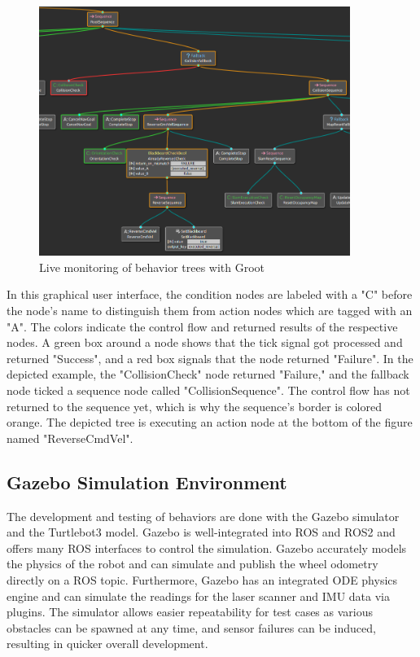 \begin{figure}[ht]
	\centering 
	\includegraphics[width=0.9\textwidth]{images/groot.png}
	\caption{Live monitoring of behavior trees with Groot}
	\label{fig:groot}
\end{figure}

In this graphical user interface, the condition nodes are labeled with a "C" before the node's name to distinguish them from action nodes which are tagged with an "A". The colors indicate the control flow and returned results of the respective nodes. A green box around a node shows that the tick signal got processed and returned "Success", and a red box signals that the node returned "Failure". In the depicted example, the "CollisionCheck" node returned "Failure," and the fallback node ticked a sequence node called "CollisionSequence". The control flow has not returned to the sequence yet, which is why the sequence's border is colored orange. The depicted tree is executing an action node at the bottom of the figure named "ReverseCmdVel".  

\subsection{Gazebo Simulation Environment}

The development and testing of behaviors are done with the Gazebo simulator and the Turtlebot3 model. Gazebo is well-integrated into ROS and ROS2 and offers many ROS interfaces to control the simulation. Gazebo accurately models the physics of the robot and can simulate and publish the wheel odometry directly on a ROS topic. Furthermore, Gazebo has an integrated ODE physics engine and can simulate the readings for the laser scanner and IMU data via plugins. The simulator allows easier repeatability for test cases as various obstacles can be spawned at any time, and sensor failures can be induced, resulting in quicker overall development.

